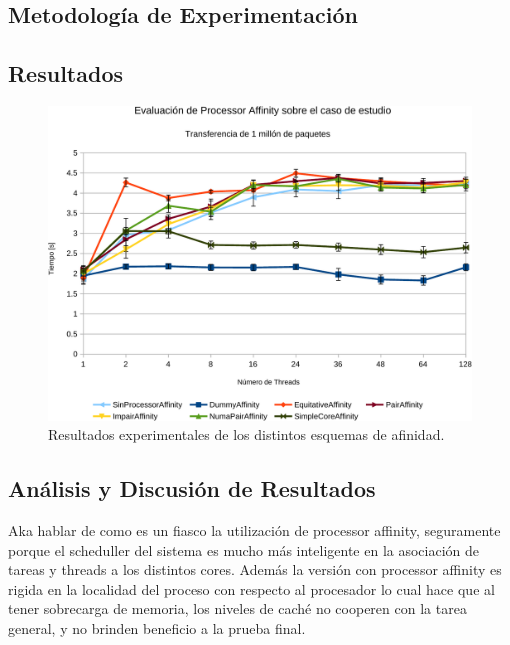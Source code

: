 \subsection{Metodología de Experimentación}

\subsection{Resultados}

\begin{figure}[!h]
	\centering
	\includegraphics[scale=.6]{resultados/processoraffinity-crop.pdf}
	\caption{Resultados experimentales de los distintos esquemas de afinidad.}
	\label{fig:resAffinity}
\end{figure}

\subsection{Análisis y Discusión de Resultados}
Aka hablar de como es un fiasco la utilización de processor affinity, seguramente porque el scheduller del sistema es mucho más inteligente en la asociación de tareas y threads a los distintos cores. Además la versión con processor affinity es rigida en la localidad del proceso con respecto al procesador lo cual hace que al tener sobrecarga de memoria, los niveles de caché no cooperen con la tarea general, y no brinden beneficio a la prueba final.

